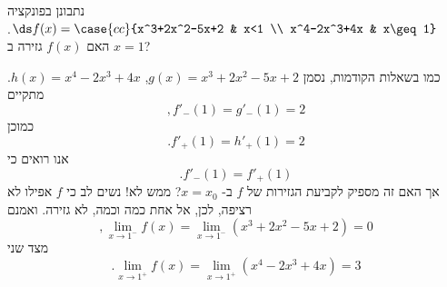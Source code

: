 נתבונן בפונקציה $\ds f(x)=\case{cc}{x^3+2x^2-5x+2 & x<1 \\ x^4-2x^3+4x & x\geq 1}$. האם $f(x)$ גזירה ב $x=1$?

\ifsol
{}
\begin{solbox}
כמו בשאלות הקודמות, נסמן
$g(x)=x^3+2x^2-5x+2$,
$h(x)=x^4-2x^3+4x$.
מתקיים
$$,f'_{-}(1)=g'_{-}(1)=2$$
כמוכן
$$.f'_{+}(1)=h'_{+}(1)=2$$
אנו רואים כי
$$.f'_{-}(1)=f'_{+}(1)$$
אך האם זה מספיק לקביעת הגזירות של
$f$
ב-
$x=x_0$?
ממש לא!
נשים לב כי
$f$
אפילו לא רציפה, לכן, אל אחת כמה וכמה, לא גזירה.
ואמנם
    $$,\lim_{x\to 1^-}f(x)=\lim_{x\to 1^-}(x^3+2x^2-5x+2)=0$$
מצד שני
$$.\lim_{x\to 1^+}f(x)=\lim_{x\to 1^+}(x^4-2x^3+4x)=3$$
\end{solbox}
\fi

